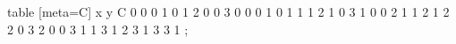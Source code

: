 table [meta=C] {
x y C
0 0 0
1 0 1
2 0 0
3 0 0
0 1 0
1 1 1
2 1 0
3 1 0
0 2 1
1 2 1
2 2 0
3 2 0
0 3 1
1 3 1
2 3 1
3 3 1
};
